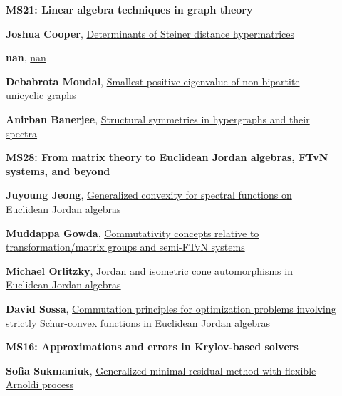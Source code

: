 \documentclass[ILAS2025-program.tex]{subfiles}
\begin{document}
\begin{description}
    \begin{description}
    \item[] {\color{mstitle}\textbf{MS21: Linear algebra techniques in graph theory}} 
    \item[] \hypertarget{up0379}{}\textbf{Joshua Cooper}, \hyperlink{down0379}{Determinants of Steiner distance hypermatrices}
        \item[] \hypertarget{up0380}{}\textbf{nan}, \hyperlink{down0380}{nan}
        \item[] \hypertarget{up0381}{}\textbf{Debabrota Mondal}, \hyperlink{down0381}{Smallest positive eigenvalue of non-bipartite unicyclic graphs}
        \item[] \hypertarget{up0382}{}\textbf{Anirban Banerjee}, \hyperlink{down0382}{Structural symmetries in hypergraphs and their spectra}
        \end{description}
    \begin{description}
    \item[] {\color{mstitle}\textbf{MS28: From matrix theory to Euclidean Jordan algebras, FTvN systems, and beyond}} 
    \item[] \hypertarget{up0383}{}\textbf{Juyoung Jeong}, \hyperlink{down0383}{Generalized convexity for spectral functions on Euclidean Jordan algebras
}
        \item[] \hypertarget{up0384}{}\textbf{Muddappa Gowda}, \hyperlink{down0384}{Commutativity concepts relative to transformation/matrix groups and semi-FTvN systems}
        \item[] \hypertarget{up0385}{}\textbf{Michael Orlitzky}, \hyperlink{down0385}{Jordan and isometric cone automorphisms in Euclidean Jordan algebras}
        \item[] \hypertarget{up0386}{}\textbf{David Sossa}, \hyperlink{down0386}{Commutation principles for optimization problems involving strictly Schur-convex functions in Euclidean Jordan algebras
}
        \end{description}
    \begin{description}
    \item[] {\color{mstitle}\textbf{MS16: Approximations and errors in Krylov-based solvers}} 
    \item[] \hypertarget{up0387}{}\textbf{Sofia Sukmaniuk}, \hyperlink{down0387}{Generalized minimal residual method with flexible Arnoldi process}

\end{description}
\end{description}
\end{document}
